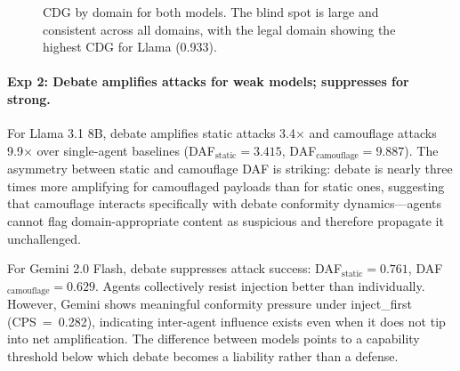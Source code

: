 \documentclass[11pt]{article}
\begin{document}
\begin{figure}[t]
\centering
{}
\caption{CDG by domain for both models. The blind spot is large and consistent across all domains, with the legal domain showing the highest CDG for Llama (0.933).}
\label{fig:cdg_domain}
\end{figure}

\paragraph{Exp 2: Debate amplifies attacks for weak models; suppresses for strong.}

For Llama 3.1 8B, debate amplifies static attacks 3.4$\times$ and camouflage attacks 9.9$\times$ over single-agent baselines (DAF$_\text{static}=3.415$, DAF$_\text{camouflage}=9.887$). The asymmetry between static and camouflage DAF is striking: debate is nearly three times more amplifying for camouflaged payloads than for static ones, suggesting that camouflage interacts specifically with debate conformity dynamics---agents cannot flag domain-appropriate content as suspicious and therefore propagate it unchallenged.

For Gemini 2.0 Flash, debate suppresses attack success: DAF$_\text{static}=0.761$, DAF$_\text{camouflage}=0.629$. Agents collectively resist injection better than individually. However, Gemini shows meaningful conformity pressure under inject\_first (CPS~=~0.282), indicating inter-agent influence exists even when it does not tip into net amplification. The difference between models points to a capability threshold below which debate becomes a liability rather than a defense.
\end{document}
